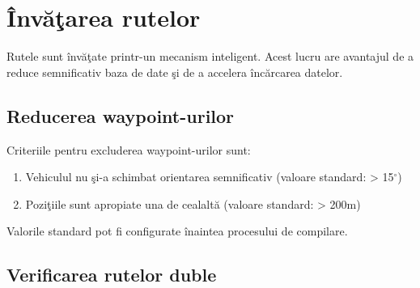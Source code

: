 \label{cap4}


\label{Chapter4} %

\thispagestyle{fancy}


\section{Învăţarea rutelor} 
Rutele sunt învăţate printr-un mecanism inteligent. Acest lucru are avantajul de a reduce semnificativ baza de date şi de a accelera încărcarea datelor.

	\subsection{Reducerea waypoint-urilor} 
	Criteriile pentru excluderea waypoint-urilor sunt:
	\begin{enumerate}
	 \setlength\itemsep{0em}
		\item Vehiculul nu şi-a schimbat orientarea semnificativ (valoare standard: > 15$^{\circ}$)
		\item Poziţiile sunt apropiate una de cealaltă (valoare standard: > 200m)
	\end{enumerate}
	
	Valorile standard pot fi configurate  înaintea procesului de compilare.
	
	
	\subsection{Verificarea rutelor duble} 
	
